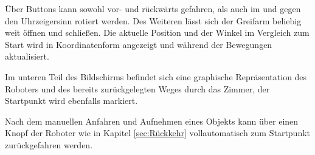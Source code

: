 Über Buttons kann sowohl vor- und rückwärts gefahren, als auch im und gegen den Uhrzeigersinn rotiert werden. Des Weiteren lässt sich der Greifarm beliebig weit öffnen und schließen. Die aktuelle Position und der Winkel im Vergleich zum Start wird in Koordinatenform angezeigt und während der Bewegungen aktualisiert.

Im unteren Teil des Bildschirms befindet sich eine graphische Repräsentation des Roboters und des bereits zurückgelegten Weges durch das Zimmer, der Startpunkt wird ebenfalls markiert.

Nach dem manuellen Anfahren und Aufnehmen eines Objekts kann über einen Knopf der Roboter wie in Kapitel \ref{sec:Rückkehr} vollautomatisch zum Startpunkt zurückgefahren werden.
